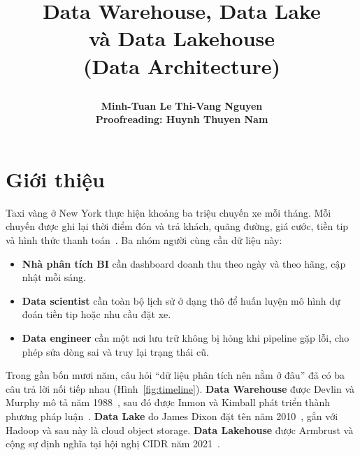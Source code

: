\documentclass[12pt]{article}
\title{%
  \parbox[c][\TitleBlockHeight][c]{0.90\textwidth}{%
    \centering
    {\fontsize{20pt}{24pt}\selectfont\bfseries Data Warehouse, Data Lake\\ và Data Lakehouse}\\[6pt]
    {\fontsize{13pt}{15pt}\selectfont (Data Architecture)}
  }%
}
\author{%
  \textbf{Minh-Tuan Le}
  \hspace{2.8em}
  \textbf{Thi-Vang Nguyen}\\
  \vspace{1em}
  \textbf{Proofreading: Huynh Thuyen Nam}
}
\date{}
\begin{document}
\maketitle
\thispagestyle{firstpage}
\vspace{-3em}

\tableofcontents
\newpage

\section{Giới thiệu}

Taxi vàng ở New York thực hiện khoảng ba triệu chuyến xe mỗi tháng. Mỗi chuyến được ghi lại thời điểm đón và trả khách, quãng đường, giá cước, tiền tip và hình thức thanh toán~\cite{tlc2026data}. Ba nhóm người cùng cần dữ liệu này:

\begin{itemize}
    \item \textbf{Nhà phân tích BI} cần dashboard doanh thu theo ngày và theo hãng, cập nhật mỗi sáng.
    \item \textbf{Data scientist} cần toàn bộ lịch sử ở dạng thô để huấn luyện mô hình dự đoán tiền tip hoặc nhu cầu đặt xe.
    \item \textbf{Data engineer} cần một nơi lưu trữ không bị hỏng khi pipeline gặp lỗi, cho phép sửa dòng sai và truy lại trạng thái cũ.
\end{itemize}

Trong gần bốn mươi năm, câu hỏi ``dữ liệu phân tích nên nằm ở đâu'' đã có ba câu trả lời nối tiếp nhau (Hình~\ref{fig:timeline}). \textbf{Data Warehouse} được Devlin và Murphy mô tả năm 1988~\cite{devlin1988architecture}, sau đó được Inmon và Kimball phát triển thành phương pháp luận~\cite{inmon2005building,kimball2013toolkit}. \textbf{Data Lake} do James Dixon đặt tên năm 2010~\cite{dixon2010datalake}, gắn với Hadoop và sau này là cloud object storage. \textbf{Data Lakehouse} được Armbrust và cộng sự định nghĩa tại hội nghị CIDR năm 2021~\cite{armbrust2021lakehouse}.
\end{document}
